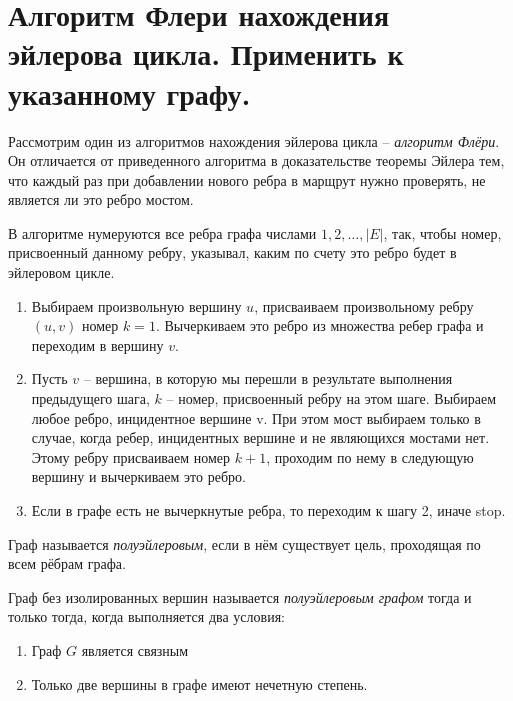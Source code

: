 \section{Алгоритм Флери нахождения эйлерова цикла. Применить к указанному графу.}

Рассмотрим один из алгоритмов нахождения эйлерова цикла
-- \textit{алгоритм Флёри}. Он отличается от приведенного алгоритма в
доказательстве теоремы Эйлера тем, что каждый раз при добавлении нового
ребра в марщрут нужно проверять, не является ли это ребро мостом.

В алгоритме нумеруются все ребра графа числами $1,2, \dots , |E|$, так, чтобы
номер, присвоенный данному ребру, указывал, каким по счету это ребро будет
в эйлеровом цикле.

\begin{enumerate}[left=0.0em, labelsep=1em, topsep=0.0em, itemsep=0pt, parsep=0.5em]
    \item Выбираем произвольную вершину $u$, присваиваем произвольному
    ребру $(u,v)$ номер $k=1$. Вычеркиваем это ребро из множества ребер графа и
    переходим в вершину $v$.
    \item Пусть $v$ -- вершина, в которую мы перешли в результате выполнения
    предыдущего шага, $k$ -- номер, присвоенный ребру на этом шаге. Выбираем
    любое ребро, инцидентное вершине v. При этом мост выбираем только в
    случае, когда ребер, инцидентных вершине и не являющихся мостами нет.
    Этому ребру присваиваем номер $k+1$, проходим по нему в следующую
    вершину и вычеркиваем это ребро.
    \item Если в графе есть не вычеркнутые ребра, то переходим к шагу 2, иначе
    stop.
\end{enumerate}

\begin{definition}
    Граф называется \textit{полуэйлеровым}, если в нём существует цель,
    проходящая по всем рёбрам графа.
\end{definition}

\begin{theorem}
    Граф без изолированных вершин называется \textit{полуэйлеровым графом}
    тогда и только тогда, когда выполняется два условия:
    \begin{enumerate}[left=0.0em, labelsep=1em, topsep=0.0em, itemsep=0pt, parsep=0.5em]
        \item Граф $G$ является связным
        \item Только две вершины в графе имеют нечетную степень.
    \end{enumerate}
\end{theorem}

